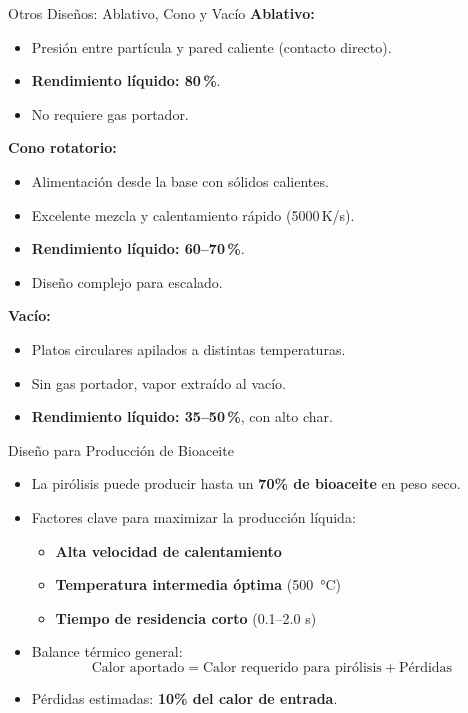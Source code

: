 \documentclass[../../main.tex]{subfiles}
\begin{document}
\begin{frame}{Otros Diseños: Ablativo, Cono y Vacío}
\small
\textbf{Ablativo:}
\begin{itemize}
  \item Presión entre partícula y pared caliente (contacto directo).
  \item \textbf{Rendimiento líquido: 80\,\%}.
  \item No requiere gas portador.
\end{itemize}

\textbf{Cono rotatorio:}
\begin{itemize}
  \item Alimentación desde la base con sólidos calientes.
  \item Excelente mezcla y calentamiento rápido (5000 K/s).
  \item \textbf{Rendimiento líquido: 60–70\,\%}.
  \item Diseño complejo para escalado.
\end{itemize}

\textbf{Vacío:}
\begin{itemize}
  \item Platos circulares apilados a distintas temperaturas.
  \item Sin gas portador, vapor extraído al vacío.
  \item \textbf{Rendimiento líquido: 35–50\,\%}, con alto char.
\end{itemize}
\end{frame}


\begin{frame}{Diseño para Producción de Bioaceite}
\small
\begin{itemize}
  \item La pirólisis puede producir hasta un \textbf{70\% de bioaceite} en peso seco.
  \item Factores clave para maximizar la producción líquida:
  \begin{itemize}
    \item \textbf{Alta velocidad de calentamiento}
    \item \textbf{Temperatura intermedia óptima} (\SI{500}{\degreeCelsius})
    \item \textbf{Tiempo de residencia corto} (0.1–2.0 s)
  \end{itemize}
  \item Balance térmico general:
  \begin{equation*}
    \text{Calor aportado} = \text{Calor requerido para pirólisis} + \text{Pérdidas}
  \end{equation*}
  \item Pérdidas estimadas: \textbf{10\% del calor de entrada}.
\end{itemize}
\end{frame}
\end{document}
